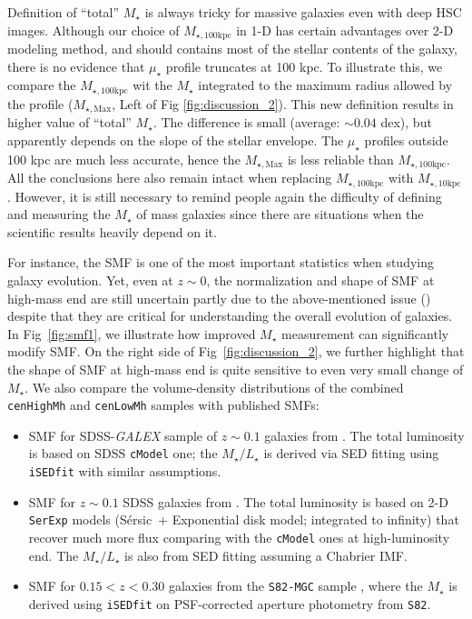 \documentclass[a4paper,fleqn,usenatbib]{mnras}
\def\ser{{S\'{e}rsic\ }}
\def\cmodel{\texttt{cModel}}
\def\rbcg{\texttt{cenHighMh}}
\def\nbcg{\texttt{cenLowMh}}
\def\mstar{{$M_{\star}$}}
\def\minn{{$M_{\star,10\mathrm{kpc}}$}}
\def\mtot{{$M_{\star,100\mathrm{kpc}}$}}
\def\mmax{{$M_{\star,\mathrm{Max}}$}}
\def\m2l{{$M_{\star}/L_{\star}$}}
\def\mden{{$\mu_{\star}$}}
\begin{document}
    Definition of ``total'' \mstar{} is always tricky for massive galaxies even 
    with deep HSC images.
    Although our choice of \mtot{} in 1-D has certain advantages over 2-D modeling 
    method, and should contains most of the stellar contents of the galaxy, there
    is no evidence that \mden{} profile truncates at 100 kpc. 
    To illustrate this, we compare the \mtot{} wit the \mstar{} integrated  
    to the maximum radius allowed by the profile (\mmax{}, Left of Fig 
    \ref{fig:discussion_2}). 
    This new definition results in higher value of ``total'' \mstar{}.
    The difference is small (average: $\sim 0.04$ dex), but apparently depends on 
    the slope of the stellar envelope. 
    The \mden{} profiles outside 100 kpc are much less accurate, hence the \mmax{} 
    is less reliable than \mtot{}. 
    All the conclusions here also remain intact when replacing \mtot{} with 
    \minn{}.  
    However, it is still necessary to remind people again the difficulty of 
    defining and measuring the \mstar{} of mass galaxies since there are 
    situations when the scientific results heavily depend on it. 
    
    For instance, the SMF is one of the most important statistics when studying 
    galaxy evolution. 
    Yet, even at $z\sim 0$, the normalization and shape of SMF at high-mass end 
    are still uncertain partly due to the above-mentioned issue 
    (\citealt{Bernardi2016}) despite that they are critical for understanding the 
    overall evolution of galaxies. 
    In Fig~\ref{fig:smf1}, we illustrate how improved \mstar{} measurement can 
    significantly modify SMF.  
    On the right side of Fig~\ref{fig:discussion_2}, we further highlight that 
    the shape of SMF at high-mass end is quite sensitive to even very small 
    change of \mstar{}.
    We also compare the volume-density distributions of the combined \rbcg{} and 
    \nbcg{} samples with published SMFs:  
    
    \begin{itemize}
        \item SMF for SDSS-\textit{GALEX} sample of $z\sim 0.1$ galaxies from 
            \citet{Moustakas13}. 
            The total luminosity is based on SDSS \cmodel{} one; the \m2l{} is 
            derived via SED fitting using \texttt{iSEDfit} with similar 
            assumptions.
        \item SMF for $z\sim 0.1$ SDSS galaxies from \citet{Bernardi2013}. 
            The total luminosity is based on 2-D \texttt{SerExp} models 
            (\ser{}$+$ Exponential disk model; integrated to infinity) that 
            recover much more flux comparing with the \cmodel{} ones at 
            high-luminosity end. 
            The \m2l{} is also from SED fitting assuming a Chabrier IMF.
        \item SMF for $0.15 < z < 0.30$ galaxies from the \texttt{S82-MGC} sample
            \citep{Leauthaud2016}, where the \mstar{} is derived using 
            \texttt{iSEDfit} on PSF-corrected aperture photometry from 
            \texttt{S82}.
    \end{itemize}
\end{document}
